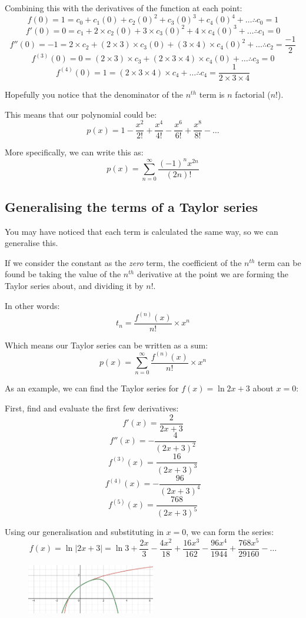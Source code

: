\documentclass[../main.tex]{subfiles}
\begin{document}
Combining this with the derivatives of the function at each point:
\[f(0) = 1 = c_0 + c_1(0) + c_2(0)^2 + c_3(0)^3 + c_4(0)^4 + \dots \therefore c_0 = 1\]
\[f'(0) = 0 = c_1 + 2\times c_2(0) + 3\times c_3(0)^2 + 4\times c_4(0)^3 + \dots \therefore c_1 = 0\]
\[f''(0) = -1 = 2\times c_2 + (2\times 3)\times c_3(0) + (3\times 4)\times c_4(0)^2 + \dots \therefore c_2 = \frac{-1}{2}\]
\[f^{(3)}(0) = 0 = (2\times 3)\times c_3 + (2\times 3\times 4)\times c_4(0) + \dots \therefore c_3 = 0\]
\[f^{(4)}(0) = 1 = (2\times 3\times 4)\times c_4 + \dots \therefore c_4 = \frac{1}{2\times 3\times 4}\]

Hopefully you notice that the denominator of the $n^{th}$ term is $n$ factorial ($n!$).

This means that our polynomial could be:
\[p(x) = 1 - \frac{x^2}{2!} +\frac{x^4}{4!} - \frac{x^6}{6!} + \frac{x^8}{8!} - \dots\]

More specifically, we can write this as:
\[p(x) = \sum_{n=0}^{\infty} \frac{(-1)^{n}x^{2n}}{(2n)!}\]

\subsection*{Generalising the terms of a Taylor series}
You may have noticed that each term is calculated the same way, so we can generalise this.

If we consider the constant as the \textit{zero} term, the coefficient of the $n^{th}$ term can be found be taking the value of the $n^{th}$ derivative at the point we are forming the Taylor series about, and dividing it by $n!$.

In other words:
\[t_n = \frac{f^{(n)}(x)}{n!}\times x^n\]

Which means our Taylor series can be written as a sum:
\[p(x) = \sum_{n=0}^{\infty} \frac{f^{(n)}(x)}{n!}\times x^n\]

As an example, we can find the Taylor series for $f(x)=\ln{2x+3}$ about $x=0$:

First, find and evaluate the first few derivatives:
\[f'(x) = \frac{2}{2x+3}\]
\[f''(x) = -\frac{4}{(2x+3)^2}\]
\[f^{(3)}(x) = \frac{16}{(2x+3)^3}\]
\[f^{(4)}(x) = -\frac{96}{(2x+3)^4}\]
\[f^{(5)}(x) = \frac{768}{(2x+3)^5} \]

Using our generalisation and substituting in $x=0$, we can form the series:
\[f(x) = \ln{|2x+3|} = \ln{3} + \frac{2x}{3} - \frac{4x^2}{18} + \frac{16x^3}{162} - \frac{96x^4}{1944} + \frac{768x^5}{29160} - \dots\]

\begin{figure}[h]
    \centering
    \includegraphics[width=0.5\textwidth]{images/taylorseries10.png}
\end{figure}
\end{document}
